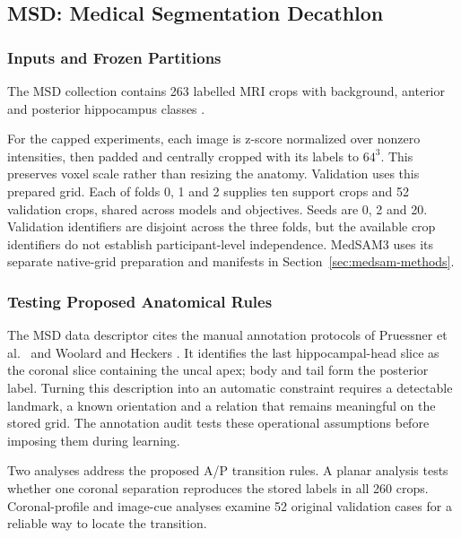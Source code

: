 \documentclass[12pt,a4paper]{article}
\begin{document}
\subsection{MSD: Medical Segmentation Decathlon}
\label{sec:msd-data-methods}

\subsubsection{Inputs and Frozen Partitions}

The MSD collection contains 263 labelled MRI crops with background,
anterior and posterior hippocampus classes \cite{simpson2019dataset}.

For the capped experiments, each image is z-score normalized over nonzero
intensities, then padded and centrally cropped with its labels to $64^3$.
This preserves voxel scale rather than resizing the anatomy. Validation
uses this prepared grid. Each of folds 0, 1 and 2 supplies ten support
crops and 52 validation crops, shared across models and objectives.
Seeds are 0, 2 and 20. Validation identifiers are disjoint across the
three folds, but the available crop identifiers do not establish
participant-level independence. MedSAM3 uses its separate native-grid
preparation and manifests
in Section~\ref{sec:medsam-methods}.

\subsubsection{Testing Proposed Anatomical Rules}
\label{sec:annotation-compatibility}

The MSD data descriptor \cite{simpson2019dataset} cites the manual
annotation protocols of Pruessner et al.\ \cite{pruessner2000volumetry}
and Woolard and Heckers \cite{woolard2012asymmetry}.
It identifies the last hippocampal-head slice as the coronal slice
containing the uncal apex; body and tail form the posterior label.
Turning this description
into an automatic constraint requires a detectable landmark, a known
orientation and a relation that remains meaningful on the stored grid.
The annotation audit tests these operational assumptions before imposing
them during learning.

Two analyses address the proposed A/P transition rules. A planar analysis tests
whether one coronal separation reproduces the stored labels in all
260 crops. Coronal-profile and image-cue analyses examine 52 original
validation cases for a reliable way to locate the transition.
\end{document}
